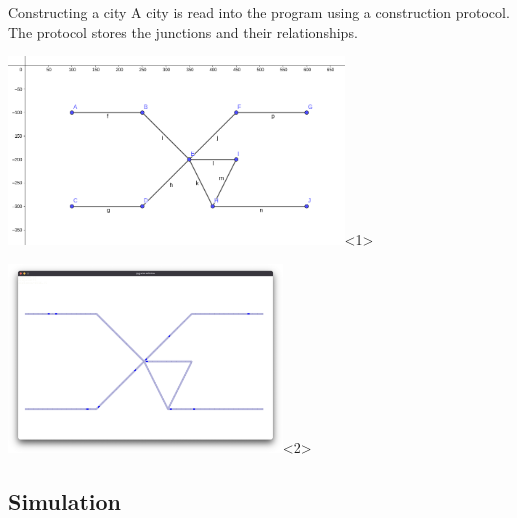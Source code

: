 \documentclass[english, aspectratio=169]{beamer}
\begin{document}
\begin{frame}{Constructing a city}
	A city is read into the program using a construction protocol. 
	The protocol stores the junctions and their relationships.
	\begin{center}

		\includegraphics[height=5cm, keepaspectratio]{images/simple_graph.png}<1>
		\par %

		\includegraphics[height=5cm, keepaspectratio]{images/simple.png}<2>	
		\par

	\end{center}
\end{frame}


\subsection{Simulation}
\end{document}
